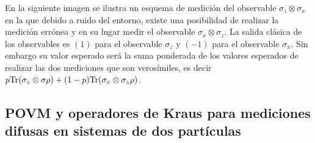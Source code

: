 
En la siguiente imagen se ilustra un esquema de medición del observable
$\sigma_z\otimes \sigma_x$ en la que debido a ruido del entorno, existe una
posibilidad de realizar la medición errónea y en su lugar medir el observable
$\sigma_x\otimes \sigma_z$. La salida clásica de los observables es $(1)$  para
el observable $\sigma _z$ y $(-1)$ para el observable $\sigma_x$. Sin embargo
su valor esperado será la suma ponderada de los valores esperados de realizar
las dos mediciones que son verosímiles, es decir $p {\rm Tr}(\sigma_z\otimes \sigma
\rho )+ (1-p){\rm Tr}(\sigma_x\otimes\sigma_z \rho)$.


\subsection{POVM y operadores de Kraus para mediciones difusas en sistemas de dos partículas}\label{Sec_POVM_para_mediciones_difusas} %
 


